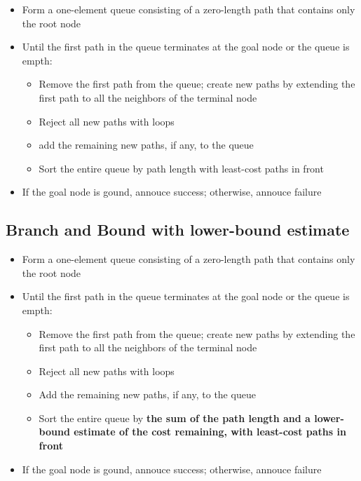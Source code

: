 \documentclass{article}
\begin{document}
\begin{itemize}
  \item Form a one-element queue consisting of a zero-length path 
    that contains only the root node
  \item Until the first path in the queue terminates at the 
    goal node or the queue is empth:
    \begin{itemize}
      \item Remove the first path from the queue; create new paths 
        by extending the first path to all the neighbors
        of the terminal node
      \item Reject all new paths with loops
      \item add the remaining new paths, if any, to the queue
      \item Sort the entire queue by path length with 
        least-cost paths in front
    \end{itemize}
  \item If the goal node is gound, annouce success; otherwise, 
    annouce failure
\end{itemize}

\subsection{Branch and Bound with lower-bound estimate}

\begin{itemize}
  \item Form a one-element queue consisting of a zero-length path 
    that contains only the root node
  \item Until the first path in the queue terminates at the 
    goal node or the queue is empth:
    \begin{itemize}
      \item Remove the first path from the queue; create new paths 
        by extending the first path to all the neighbors
        of the terminal node
      \item Reject all new paths with loops
      \item Add the remaining new paths, if any, to the queue
      \item Sort the entire queue by \textbf{the sum of the path
        length and a lower-bound estimate of the cost
        remaining, with least-cost paths in front}
    \end{itemize}
  \item If the goal node is gound, annouce success; otherwise, 
    annouce failure
\end{itemize}
\end{document}
